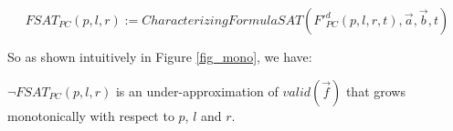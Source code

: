 \documentclass[runningheads,a4paper,orivec]{llncs}
\begin{document}
\begin{equation}\label{fsat_pc}
FSAT_{PC}(p,l,r):=CharacterizingFormulaSAT(F'^d_{PC}(p,l,r,t),\vec{a},\vec{b},t)
\end{equation}

% 
So as shown intuitively in Figure \ref{fig_mono},
we have:

\begin{proposition}\label{prop_pc}
$\neg FSAT_{PC}(p,l,r)$ is an under-approximation of $valid(\vec{f})$ that grows monotonically with respect to $p$, $l$ and $r$.
\end{proposition}
\end{document}
